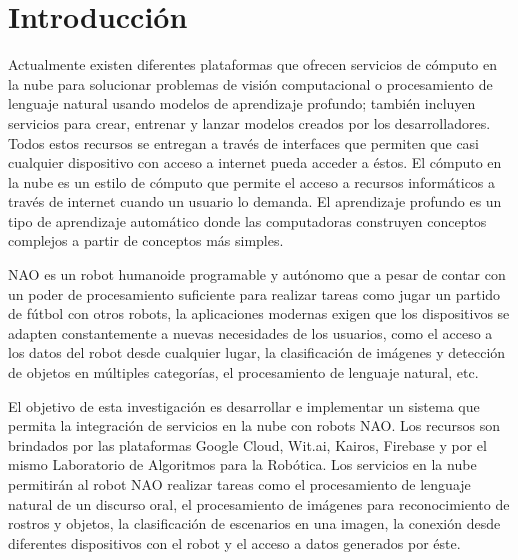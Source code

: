 

\chapter*{Introducción}
\label{\detokenize{introduction:cloudnao-una-arquitectura-de-software-para-la-integracion-de-computo-en-la-nube-con-robots-nao}}\label{\detokenize{introduction:introduccion}}\label{\detokenize{introduction::doc}}
%
Actualmente existen diferentes plataformas que 
ofrecen servicios
de cómputo en la nube para solucionar problemas de 
visión computacional o
procesamiento de lenguaje natural usando modelos
de aprendizaje profundo; también incluyen servicios 
para crear, entrenar y lanzar
modelos creados por los desarrolladores.
Todos estos recursos se entregan a través de 
interfaces que
permiten que casi cualquier dispositivo con acceso a 
internet
pueda acceder a éstos.
El cómputo en la nube es un estilo de cómputo que 
permite el acceso a 
recursos informáticos a través de internet cuando un
usuario lo demanda. El aprendizaje profundo es un 
tipo
de aprendizaje automático donde las computadoras 
construyen
conceptos complejos a partir de conceptos más 
simples.



NAO es un robot humanoide programable y autónomo
que a pesar de contar con
un poder de procesamiento suficiente para realizar 
tareas como
jugar un partido de fútbol con otros robots,
la aplicaciones modernas
exigen que los dispositivos se adapten constantemente a nuevas necesidades
de los usuarios, como el acceso a los datos
del robot desde cualquier lugar, la 
clasificación de imágenes y detección de
objetos en múltiples categorías, el 
procesamiento de lenguaje natural, etc.



El objetivo de esta investigación es desarrollar e implementar un sistema
que permita la integración de servicios en la nube
con robots NAO.
Los recursos son brindados por las plataformas
Google Cloud, Wit.ai, Kairos, Firebase y por
el mismo Laboratorio de Algoritmos para la
Robótica.
Los servicios en la nube permitirán al robot NAO
realizar tareas como el procesamiento de lenguaje
natural de un discurso oral, el procesamiento 
de imágenes para reconocimiento de rostros
y objetos, la clasificación de escenarios en una
imagen, la conexión desde diferentes dispositivos
con el robot y el acceso a datos generados por
éste.


